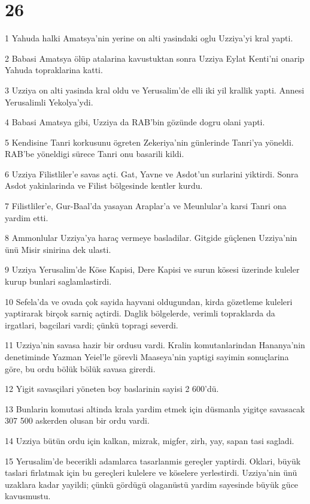 \chapter{26}

\par 1 Yahuda halki Amatsya'nin yerine on alti yasindaki oglu Uzziya'yi kral yapti.
\par 2 Babasi Amatsya ölüp atalarina kavustuktan sonra Uzziya Eylat Kenti'ni onarip Yahuda topraklarina katti.
\par 3 Uzziya on alti yasinda kral oldu ve Yerusalim'de elli iki yil krallik yapti. Annesi Yerusalimli Yekolya'ydi.
\par 4 Babasi Amatsya gibi, Uzziya da RAB'bin gözünde dogru olani yapti.
\par 5 Kendisine Tanri korkusunu ögreten Zekeriya'nin günlerinde Tanri'ya yöneldi. RAB'be yöneldigi sürece Tanri onu basarili kildi.
\par 6 Uzziya Filistliler'e savas açti. Gat, Yavne ve Asdot'un surlarini yiktirdi. Sonra Asdot yakinlarinda ve Filist bölgesinde kentler kurdu.
\par 7 Filistliler'e, Gur-Baal'da yasayan Araplar'a ve Meunlular'a karsi Tanri ona yardim etti.
\par 8 Ammonlular Uzziya'ya haraç vermeye basladilar. Gitgide güçlenen Uzziya'nin ünü Misir sinirina dek ulasti.
\par 9 Uzziya Yerusalim'de Köse Kapisi, Dere Kapisi ve surun kösesi üzerinde kuleler kurup bunlari saglamlastirdi.
\par 10 Sefela'da ve ovada çok sayida hayvani oldugundan, kirda gözetleme kuleleri yaptirarak birçok sarniç açtirdi. Daglik bölgelerde, verimli topraklarda da irgatlari, bagcilari vardi; çünkü topragi severdi.
\par 11 Uzziya'nin savasa hazir bir ordusu vardi. Kralin komutanlarindan Hananya'nin denetiminde Yazman Yeiel'le görevli Maaseya'nin yaptigi sayimin sonuçlarina göre, bu ordu bölük bölük savasa girerdi.
\par 12 Yigit savasçilari yöneten boy baslarinin sayisi 2 600'dü.
\par 13 Bunlarin komutasi altinda krala yardim etmek için düsmanla yigitçe savasacak 307 500 askerden olusan bir ordu vardi.
\par 14 Uzziya bütün ordu için kalkan, mizrak, migfer, zirh, yay, sapan tasi sagladi.
\par 15 Yerusalim'de becerikli adamlarca tasarlanmis gereçler yaptirdi. Oklari, büyük taslari firlatmak için bu gereçleri kulelere ve köselere yerlestirdi. Uzziya'nin ünü uzaklara kadar yayildi; çünkü gördügü olaganüstü yardim sayesinde büyük güce kavusmustu.
